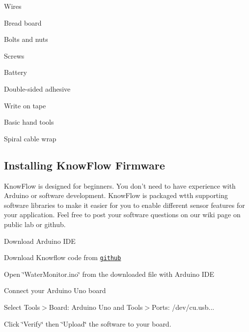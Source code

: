 \begin{DoxyItemize}
\item Wires
\item Bread board
\item Bolts and nuts
\item Screws
\item Battery
\item Double-\/sided adhesive
\item Write on tape
\item Basic hand tools
\item Spiral cable wrap
\end{DoxyItemize}

\subsection*{Installing Know\+Flow Firmware}

Know\+Flow is designed for beginners. You don’t need to have experience with Arduino or software development. Know\+Flow is packaged wtth supporting software libraries to make it easier for you to enable different sensor features for your application. Feel free to post your software questions on our wiki page on public lab or github.


\begin{DoxyEnumerate}
\item Download Arduino I\+DE
\end{DoxyEnumerate}
\begin{DoxyEnumerate}
\item Download Knowflow code from \href{https://github.com/KnowFlow/KnowFlow_AWM}{\tt github}
\end{DoxyEnumerate}
\begin{DoxyEnumerate}
\item Open \char`\"{}\+Water\+Monitor.\+ino\char`\"{} from the downloaded file with Arduino I\+DE
\end{DoxyEnumerate}
\begin{DoxyEnumerate}
\item Connect your Arduino Uno board
\end{DoxyEnumerate}
\begin{DoxyEnumerate}
\item Select Tools$>$Board\+: Arduino Uno and Tools$>$Ports\+: /dev/cu.usb...
\end{DoxyEnumerate}
\begin{DoxyEnumerate}
\item Click \char`\"{}\+Verify\char`\"{} then \char`\"{}\+Upload\char`\"{} the software to your board.
\end{DoxyEnumerate}

